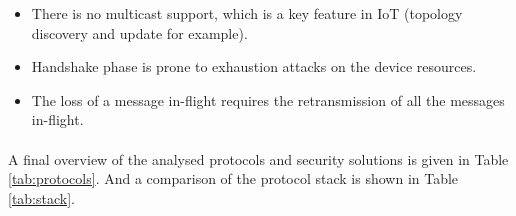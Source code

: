 \begin{itemize}
	\item There is no multicast support, which is a key feature in \ac{IoT} (topology discovery and update for example).
	\item Handshake phase is prone to exhaustion attacks on the device resources.
	\item The loss of a message in-flight requires the retransmission of all the messages in-flight.
\end{itemize}

\paragraph{}
	A final overview of the analysed protocols and security solutions is given in Table \ref{tab:protocols}. And a comparison of the protocol stack is shown in Table \ref{tab:stack}. 

